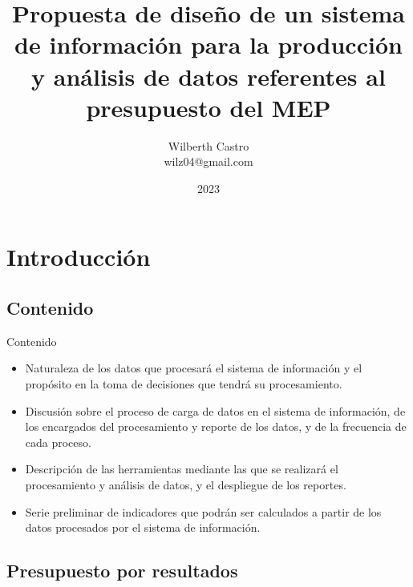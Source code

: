 \documentclass[xcolor=table, aspectratio=169]{beamer}
\title[Propuesta de dise\~no]{Propuesta de dise\~no de un sistema de informaci\'on para la producci\'on y an\'alisis de datos referentes al presupuesto del MEP}
\author[WilC]
{
	Wilberth Castro \\
	\small{wilz04@gmail.com}
}
\date[22 May 2023]
{
	2023
}
\begin{document}
\begin{frame}
	\maketitle
\end{frame}
\section{Introducci\'on}

\subsection{Contenido}

\begin{frame}[t]{Contenido}
	\begin{itemize}
		\item Naturaleza de los datos que procesar\'a el sistema de informaci\'on y el prop\'osito en la toma de decisiones que tendr\'a su procesamiento.
		\item Discusi\'on sobre el proceso de carga de datos en el sistema de informaci\'on, de los encargados del procesamiento y reporte de los datos, y de la frecuencia de cada proceso.
		\item Descripci\'on de las herramientas mediante las que se realizar\'a el procesamiento y an\'alisis de datos, y el despliegue de los reportes.
		\item Serie preliminar de indicadores que podr\'an ser calculados a partir de los datos procesados por el sistema de informaci\'on.
	\end{itemize}
\end{frame}

\subsection{Presupuesto por resultados}
\end{document}
